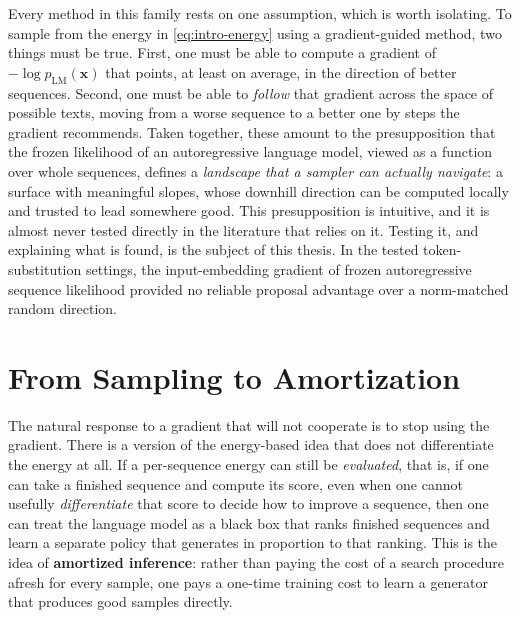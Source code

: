 Every method in this family rests on one assumption, which is worth isolating. To sample from the energy in \eqref{eq:intro-energy} using a gradient-guided method, two things must be true. First, one must be able to compute a gradient of $-\log p_{\text{LM}}(\bm{x})$ that points, at least on average, in the direction of better sequences. Second, one must be able to \emph{follow} that gradient across the space of possible texts, moving from a worse sequence to a better one by steps the gradient recommends. Taken together, these amount to the presupposition that the frozen likelihood of an autoregressive language model, viewed as a function over whole sequences, defines a \emph{landscape that a sampler can actually navigate}: a surface with meaningful slopes, whose downhill direction can be computed locally and trusted to lead somewhere good. This presupposition is intuitive, and it is almost never tested directly in the literature that relies on it. Testing it, and explaining what is found, is the subject of this thesis. In the tested token-substitution settings, the input-embedding gradient of frozen autoregressive sequence likelihood provided no reliable proposal advantage over a norm-matched random direction.

\section{From Sampling to Amortization}
\label{sec:intro-amortize}

The natural response to a gradient that will not cooperate is to stop using the gradient. There is a version of the energy-based idea that does not differentiate the energy at all. If a per-sequence energy can still be \emph{evaluated}, that is, if one can take a finished sequence and compute its score, even when one cannot usefully \emph{differentiate} that score to decide how to improve a sequence, then one can treat the language model as a black box that ranks finished sequences and learn a separate policy that generates in proportion to that ranking. This is the idea of \textbf{amortized inference}: rather than paying the cost of a search procedure afresh for every sample, one pays a one-time training cost to learn a generator that produces good samples directly.

